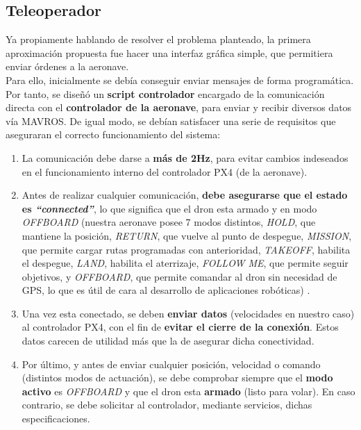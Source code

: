 \subsection{Teleoperador}
\label{subsec:teleoperador}

Ya propiamente hablando de resolver el problema planteado, la primera aproximación propuesta fue hacer una interfaz gráfica simple, que permitiera enviar órdenes a la aeronave.\\

Para ello, inicialmente se debía conseguir enviar mensajes de forma programática. Por tanto, se diseñó un \textbf{script controlador} encargado de la comunicación directa con el \textbf{controlador de la aeronave}, para enviar y recibir diversos datos vía MAVROS. De igual modo, se debían satisfacer una serie de requisitos que aseguraran el correcto funcionamiento del sistema:

\begin{enumerate}
	\item La comunicación debe darse a \textbf{más de 2Hz}, para evitar cambios indeseados en el funcionamiento interno del controlador PX4 (de la aeronave).

	\item Antes de realizar cualquier comunicación, \textbf{debe asegurarse que el estado es \emph{``connected''}}, lo que significa que el dron esta armado y en modo \emph{OFFBOARD} (nuestra aeronave posee 7 modos distintos, \emph{HOLD}, que mantiene la posición, \emph{RETURN}, que vuelve al punto de despegue, \emph{MISSION}, que permite cargar rutas programadas con anterioridad, \emph{TAKEOFF}, habilita el despegue, \emph{LAND}, habilita el aterrizaje, \emph{FOLLOW ME}, que permite seguir objetivos, y \emph{OFFBOARD}, que permite comandar al dron sin necesidad de GPS, lo que es útil de cara al desarrollo de aplicaciones robóticas) \cite{flight-modes}.

    \item Una vez esta conectado, se deben \textbf{enviar datos} (velocidades en nuestro caso) al controlador PX4, con el fin de \textbf{evitar el cierre de la conexión}. Estos datos carecen de utilidad más que la de asegurar dicha conectividad.

    \item Por último, y antes de enviar cualquier posición, velocidad o comando (distintos modos de actuación), se debe comprobar siempre que el \textbf{modo activo} es \emph{OFFBOARD} y que el dron esta \textbf{armado} (listo para volar). En caso contrario, se debe solicitar al controlador, mediante servicios, dichas especificaciones.
\end{enumerate}

